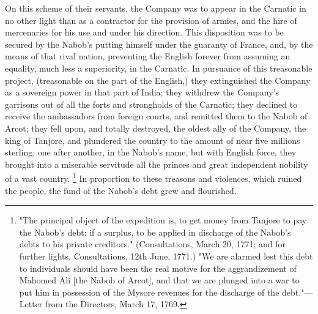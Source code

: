 On this scheme of their servants, the Company was to appear in the Carnatic in no other light than as a contractor for the provision of armies, and the hire of mercenaries for his use and under his direction. This disposition was to be secured by the Nabob's putting himself under the guaranty of France, and, by the means of that rival nation, preventing the English forever from assuming an equality, much less a superiority, in the Carnatic. In pursuance of this treasonable project, (treasonable on the part of the English,) they extinguished the Company as a sovereign power in that part of India; they withdrew the Company's garrisons out of all the forts and strongholds of the Carnatic; they declined to receive the ambassadors from foreign courts, and remitted them to the Nabob of Arcot; they fell upon, and totally destroyed, the oldest ally of the Company, the king of Tanjore, and plundered the country to the amount of near five millions sterling; one after another, in the Nabob's name, but with English force, they brought into a miserable servitude all the princes and great independent nobility of a vast country.
\footnote{ "The principal object of the expedition is, to get money from Tanjore to pay the Nabob's debt: if a surplus, to be applied in discharge of the Nabob's debts to his private creditors." (Consultations, March 20, 1771; and for further lights, Consultations, 12th June, 1771.) "We are alarmed lest this debt to individuals should have been the real motive for the aggrandizement of Mahomed Ali [the Nabob of Arcot], and that we are plunged into a war to put him in possession of the Mysore revenues for the discharge of the debt."—Letter from the Directors, March 17, 1769.}
 In proportion to these treasons and violences, which ruined the people, the fund of the Nabob's debt grew and flourished.

